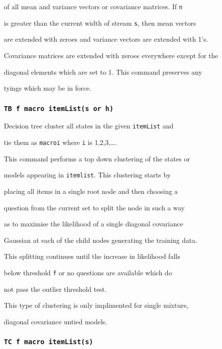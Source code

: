 of all mean and variance vectors or covariance matrices.  If \texttt{n}


is greater than the current width of stream \texttt{s}, then mean vectors


are extended with zeroes and variance vectors are extended with 1's.


Covariance matrices are extended with zeroes everywhere except for the


diagonal elements which are set to 1.  This command preserves any


tyings which may be in force.





\subsubsection*{\tt TB f macro itemList(s or h)}





Decision tree cluster all states in the given \texttt{itemList} and 


tie them as \texttt{macroi} where \texttt{i} is 1,2,3,\ldots. 


This command performs a top down clustering of the states or


models appearing in \texttt{itemlist}.  This clustering starts by


placing all items in a single root node and then choosing a


question from the current set to split the node in such a way


as to maximise the likelihood of a single diagonal covariance


Gaussian at each of the child nodes generating the training data.


This splitting continues until the increase in likelihood falls


below threshold \texttt{f} or no questions are available which do


not pass the outlier threshold test.


This type of clustering is only implimented for single mixture,


diagonal covariance untied models.





\subsubsection*{\tt TC f macro itemList(s)}





